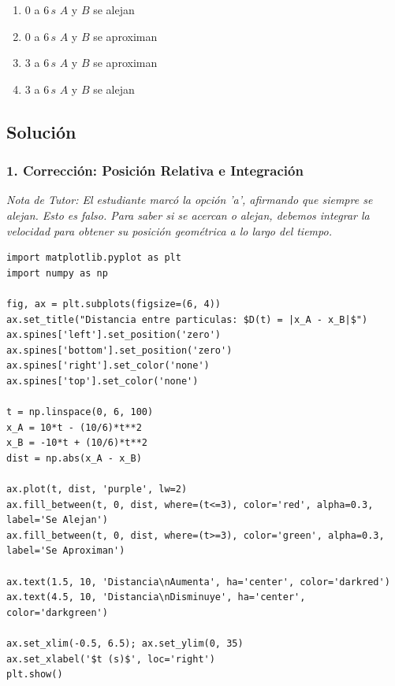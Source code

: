\documentclass[12pt, a4paper]{article}
\begin{document}
\begin{enumerate}[label=\alph*)]
    \item $0$ a $6\,\si{s}$ $A$ y $B$ se alejan
    \item $0$ a $6\,\si{s}$ $A$ y $B$ se aproximan
    \item $3$ a $6\,\si{s}$ $A$ y $B$ se aproximan
    \item $3$ a $6\,\si{s}$ $A$ y $B$ se alejan
\end{enumerate}

\subsection*{Solución}

\subsubsection*{1. Corrección: Posición Relativa e Integración}
\textit{Nota de Tutor: El estudiante marcó la opción 'a', afirmando que siempre se alejan. Esto es falso. Para saber si se acercan o alejan, debemos integrar la velocidad para obtener su posición geométrica a lo largo del tiempo.}

\begin{lstlisting}
import matplotlib.pyplot as plt
import numpy as np

fig, ax = plt.subplots(figsize=(6, 4))
ax.set_title("Distancia entre particulas: $D(t) = |x_A - x_B|$")
ax.spines['left'].set_position('zero')
ax.spines['bottom'].set_position('zero')
ax.spines['right'].set_color('none')
ax.spines['top'].set_color('none')

t = np.linspace(0, 6, 100)
x_A = 10*t - (10/6)*t**2
x_B = -10*t + (10/6)*t**2
dist = np.abs(x_A - x_B)

ax.plot(t, dist, 'purple', lw=2)
ax.fill_between(t, 0, dist, where=(t<=3), color='red', alpha=0.3, label='Se Alejan')
ax.fill_between(t, 0, dist, where=(t>=3), color='green', alpha=0.3, label='Se Aproximan')

ax.text(1.5, 10, 'Distancia\nAumenta', ha='center', color='darkred')
ax.text(4.5, 10, 'Distancia\nDisminuye', ha='center', color='darkgreen')

ax.set_xlim(-0.5, 6.5); ax.set_ylim(0, 35)
ax.set_xlabel('$t (s)$', loc='right')
plt.show()
\end{lstlisting}
\end{document}
